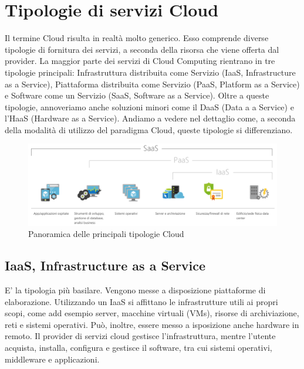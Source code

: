 \section{Tipologie di servizi Cloud}
Il termine Cloud risulta in realtà molto generico. Esso comprende diverse tipologie di fornitura dei servizi, a seconda della risorsa che viene offerta dal provider. La maggior parte dei servizi di Cloud Computing rientrano in tre tipologie principali: Infrastruttura distribuita come Servizio (IaaS, Infrastructure as a Service), Piattaforma distribuita come Servizio (PaaS, Platform as a Service) e Software come un Servizio (SaaS, Software as a Service). Oltre a queste tipologie, annoveriamo anche soluzioni minori come il DaaS (Data a a Service) e l'HaaS (Hardware as a Service). Andiamo a vedere nel dettaglio come, a seconda della modalità di utilizzo del paradigma Cloud, queste tipologie si differenziano. 
\begin{figure}
	\centering
	\includegraphics[width=0.7\linewidth]{capitoli/imgs/TipologieCloud}
	\caption{Panoramica delle principali tipologie Cloud}
	\label{fig:tipologiecloud}
\end{figure}

\subsection{IaaS, Infrastructure as a Service}
E' la tipologia più basilare. Vengono messe a disposizione piattaforme di elaborazione. Utilizzando un IaaS si affittano le infrastrutture utili ai propri scopi, come add esempio server, macchine virtuali (VMs), risorse di archiviazione, reti e sistemi operativi. Può, inoltre, essere messo a isposizione anche hardware in remoto. Il provider di servizi cloud gestisce l'infrastruttura, mentre l'utente acquista, installa, configura e gestisce il software, tra cui sistemi operativi, middleware e applicazioni.
